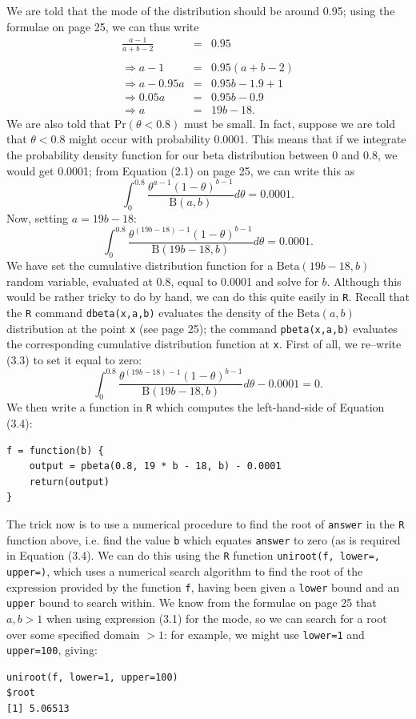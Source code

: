 {We are told that the mode of the distribution should be around 0.95; using the formulae on page 25, we can thus write
\begin{eqnarray}
\frac{a-1}{a+b-2}    &=& 0.95  \\
                     & &      \nonumber \\
 \Rightarrow a-1     &=&0.95(a+b-2)  \nonumber \\
 \Rightarrow a-0.95a &=&0.95b - 1.9 + 1 \nonumber \\
 \Rightarrow 0.05a   &=&0.95b - 0.9 \nonumber \\
 \Rightarrow   a     &=&19b - 18.
\end{eqnarray}
We are also told that $\text{Pr}(\theta<0.8)$ must be small.  In fact, suppose we are told that $\theta<0.8$ might occur with probability 0.0001.  This means that if we integrate the probability density function for our beta distribution between 0 and 0.8, we would get 0.0001; from Equation (2.1) on page 25, we can write this as
$$\int_{0}^{0.8} \frac{\theta^{a-1}(1-\theta)^{b-1}}{\mathrm{B}(a,b)} d\theta = 0.0001. $$
Now, setting $a = 19b-18$:
\begin{equation}
 \int_{0}^{0.8} \frac{\theta^{(19b-18)-1}(1-\theta)^{b-1}}{\mathrm{B}(19b-18,b)} d\theta = 0.0001.
\end{equation}
We have set the cumulative distribution function for a $\mathrm{Beta}(19b-18,b)$ random variable, evaluated at 0.8, equal to 0.0001 and solve for $b$.  Although this would be rather tricky to do by hand, we can do this quite easily in \texttt{R}.  Recall that the \texttt{R} command \texttt{dbeta(x,a,b)} evaluates the density of the $\mathrm{Beta}(a,b)$ distribution at the point \texttt{x} (see page 25); the command \texttt{pbeta(x,a,b)} evaluates the corresponding cumulative distribution function at \texttt{x}.  First of all, we re--write (3.3) to set it equal to zero:
\begin{equation}
\int_{0}^{0.8} \frac{\theta^{(19b-18)-1}(1-\theta)^{b-1}}{\mathrm{B}(19b-18,b)} d\theta -0.0001 = 0.
\end{equation}
We then write a function in \texttt{R} which computes the left-hand-side of Equation (3.4):
\begin{verbatim}
f = function(b) {
    output = pbeta(0.8, 19 * b - 18, b) - 0.0001
    return(output)
}
\end{verbatim}
The trick now is to use a numerical procedure to find the root of \texttt{answer} in the \texttt{R} function above, i.e. find the value \texttt{b} which equates \texttt{answer} to zero (as is required in Equation (3.4).  We can do this using the \texttt{R} function \texttt{uniroot(f, lower=, upper=)}, which uses a numerical search algorithm to find the root of the expression provided by the function \texttt{f}, having been given a \texttt{lower} bound and an \texttt{upper} bound to search within.  We know from the formulae on page 25 that $a,b>1$ when using expression (3.1) for the mode, so we can search for a root over some specified domain $>1$: for example, we might use \texttt{lower=1} and \texttt{upper=100}, giving:
\begin{verbatim}
uniroot(f, lower=1, upper=100)
$root
[1] 5.06513


\end{verbatim}}
